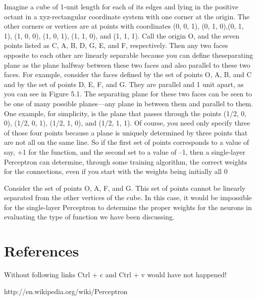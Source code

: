 \documentclass[12pt, right open]{memoir}
\begin{document}
Imagine a cube of 1-unit length for each of its edges and lying in the positive octant in a xyz-rectangular coordinate system with one corner at the origin.
The other corners or vertices are at points with coordinates (0, 0, 1), (0, 1, 0),(0, 1, 1), (1, 0, 0), (1, 0, 1), (1, 1, 0), and (1, 1, 1). Call the origin O, and the seven points listed as C, A, B, D, G, E, and F, respectively. Then any two faces
opposite to each other are linearly separable because you can define theseparating plane as the plane halfway between these two faces and also parallel to these two faces.
For example, consider the faces defined by the set of points O, A, B, and C and
by the set of points D, E, F, and G. They are parallel and 1 unit apart, as you
can see in Figure 5.1. The separating plane for these two faces can be seen to
be one of many possible planes—any plane in between them and parallel to
them. One example, for simplicity, is the plane that passes through the points
(1/2, 0, 0), (1/2, 0, 1), (1/2, 1, 0), and (1/2, 1, 1). Of course, you need only
specify three of those four points because a plane is uniquely determined by
three points that are not all on the same line. So if the first set of points
corresponds to a value of say, +1 for the function, and the second set to a value
of –1, then a single-layer Perceptron can determine, through some training
algorithm, the correct weights for the connections, even if you start with the
weights being initially all 0

Consider the set of points O, A, F, and G. This set of points cannot be linearly
separated from the other vertices of the cube. In this case, it would be
impossible for the single-layer Perceptron to determine the proper weights for
the neurons in evaluating the type of function we have been discussing.
\chapter{References}
Without following links Ctrl + c and Ctrl + v would have not happened!

http://en.wikipedia.org/wiki/Perceptron
\end{document}
